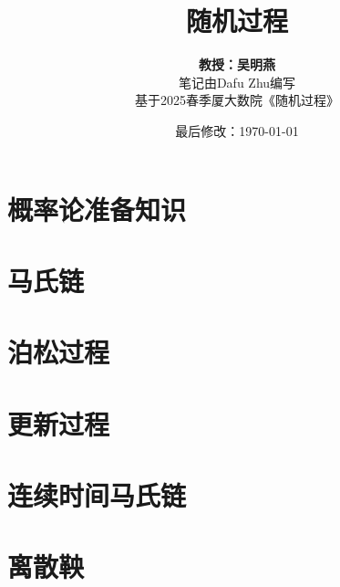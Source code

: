 \documentclass{article}
\title{随机过程}
\author{\textbf{教授：吴明燕} \\ 笔记由Dafu Zhu编写 \\ 基于2025春季厦大数院《随机过程》}
\date{最后修改：\today}
\begin{document}
\maketitle

\tableofcontents
{}

\pagebreak

\section{概率论准备知识}







\pagebreak

\section{马氏链}










\pagebreak

\section{泊松过程}





\pagebreak

\section{更新过程}


\pagebreak

\section{连续时间马氏链}




\pagebreak

\section{离散鞅}




\pagebreak



\end{document}
